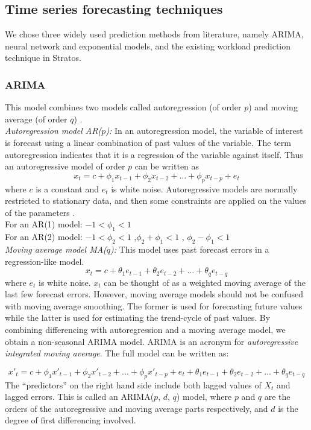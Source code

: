 \subsection{Time series forecasting techniques}
We chose three widely used prediction methods from literature, namely ARIMA, neural network and exponential models, and the existing workload prediction technique in Stratos.

\subsubsection{ARIMA}
This model combines two models called autoregression (of order $p$) and moving average (of order $q$) .\\

\textit{Autoregression model AR($p$):}
In an autoregression model, the variable of interest is forecast using a linear combination of past values of the variable. The term autoregression indicates that it is a regression of the variable against itself. Thus an autoregressive model of order $p$ can be written as
	$$x_t = c + \phi_1x_{ t-1} + \phi_2x_{t-2} +...+ \phi_px_{t-p} + e_{t}$$
where $c$ is a constant and $e_t$ is white noise. Autoregressive models are normally restricted to stationary data, and then some constraints are applied on the values of the parameters \cite{Forecasting_OTexts}. \\
For an AR(1) model: $-1 < \phi_{1} < 1$ \\
For an AR(2) model: $-1 < \phi_{2} < 1$ ,$\phi_{2}+ \phi_{1} < 1$ , $\phi_{2} - \phi_{1} < 1$ \\

\textit{Moving average model MA($q$):}
This model uses past forecast errors in a regression-like model.
	$$x_t =  c + \theta_1e_{ t-1} + \theta_2e_{t-2} +...+ \theta_qe_{t-q}$$
where $e_t$ is white noise. $x_t$ can be thought of as a weighted moving average of the last few forecast errors. However, moving average models should not be confused with moving average smoothing. The former is used for forecasting future values while the latter is used for estimating the trend-cycle of past values.
By combining differencing with autoregression and a moving average model, we obtain a non-seasonal ARIMA model. ARIMA is an acronym for \textit{autoregressive integrated moving average}. The full model can be written as:

	$${x}'_t = c + \phi_1{x}'_{ t-1} + \phi_2{x}'_{t-2} +...+ \phi_p{x}'_{t-p} + e_{t} + \theta_1e_{ t-1} + \theta_2e_{t-2} +...+ \theta_qe_{t-q}$$
The “predictors” on the right hand side include both lagged values of $X_t$ and lagged errors. This is called an ARIMA($p$, $d$, $q$) model, where $p$ and $q$ are the orders of the autoregressive and moving average parts respectively, and $d$ is the degree of first differencing involved.


